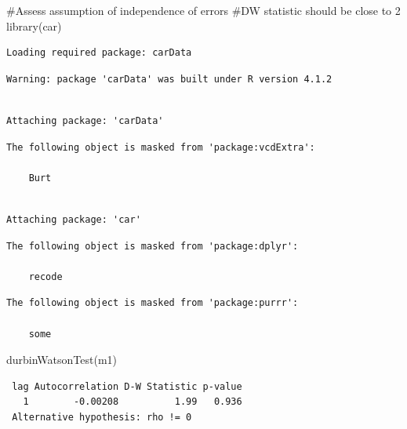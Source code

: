 \documentclass[
  letterpaper,
  DIV=11,
  numbers=noendperiod]{scrreprt}
\newenvironment{Shaded}{\begin{snugshade}}{\end{snugshade}}
\newcommand{\CommentTok}[1]{\textcolor[rgb]{0.37,0.37,0.37}{#1}}
\newcommand{\FunctionTok}[1]{\textcolor[rgb]{0.28,0.35,0.67}{#1}}
\newcommand{\NormalTok}[1]{\textcolor[rgb]{0.00,0.23,0.31}{#1}}
\begin{document}
\begin{Shaded}
\begin{Highlighting}[]
\CommentTok{\#Assess assumption of independence of errors}
\CommentTok{\#DW statistic should be close to 2}
\FunctionTok{library}\NormalTok{(car)}
\end{Highlighting}
\end{Shaded}

\begin{verbatim}
Loading required package: carData
\end{verbatim}

\begin{verbatim}
Warning: package 'carData' was built under R version 4.1.2
\end{verbatim}

\begin{verbatim}

Attaching package: 'carData'
\end{verbatim}

\begin{verbatim}
The following object is masked from 'package:vcdExtra':

    Burt
\end{verbatim}

\begin{verbatim}

Attaching package: 'car'
\end{verbatim}

\begin{verbatim}
The following object is masked from 'package:dplyr':

    recode
\end{verbatim}

\begin{verbatim}
The following object is masked from 'package:purrr':

    some
\end{verbatim}

\begin{Shaded}
\begin{Highlighting}[]
\FunctionTok{durbinWatsonTest}\NormalTok{(m1)}
\end{Highlighting}
\end{Shaded}

\begin{verbatim}
 lag Autocorrelation D-W Statistic p-value
   1        -0.00208          1.99   0.936
 Alternative hypothesis: rho != 0
\end{verbatim}
\end{document}
